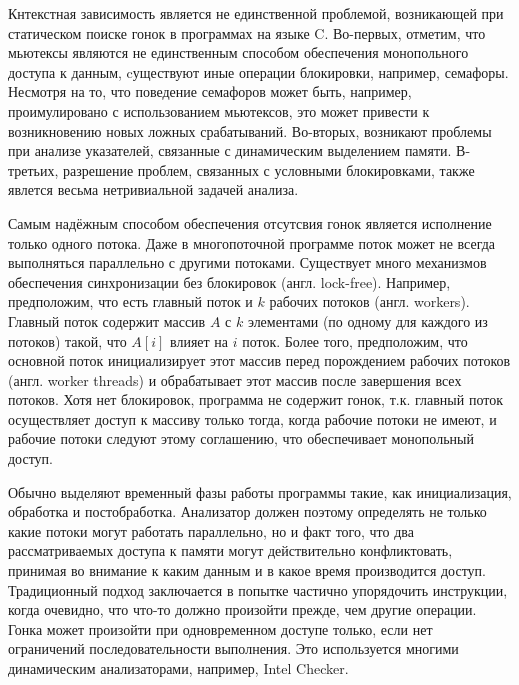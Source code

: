\Conclusion

Кнтекстная зависимость является не единственной проблемой, возникающей при статическом поиске гонок в программах на языке C. Во-первых, отметим, что мьютексы являются не единственным способом обеспечения монопольного доступа к данным, cуществуют иные операции блокировки, например, семафоры. Несмотря на то, что поведение семафоров может быть, например, проимулировано с использованием мьютексов, это может привести к возникновению новых ложных срабатываний. Во-вторых, возникают проблемы при анализе указателей, связанные с динамическим выделением памяти. В-третьих, разрешение проблем, связанных с условными блокировками, также явлется весьма нетривиальной задачей анализа.

Самым надёжным способом обеспечения отсутсвия гонок является исполнение только одного потока. Даже в многопоточной программе поток может не всегда выполняться параллельно с другими потоками. Существует много механизмов обеспечения синхронизации без блокировок (англ. lock-free). Например, предположим, что есть главный поток и $k$ рабочих потоков (англ. workers). Главный поток содержит массив $A$ с $k$ элементами (по одному для каждого из потоков) такой, что $A[i]$ влияет на $i$ поток. Более того, предположим, что основной поток инициализирует этот массив перед порождением рабочих потоков (англ. worker threads) и обрабатывает этот массив после завершения всех потоков. Хотя нет блокировок, программа не содержит гонок, т.к. главный поток осуществляет доступ к массиву только тогда, когда рабочие потоки не имеют, и рабочие потоки следуют этому соглашению, что обеспечивает монопольный доступ.

Обычно выделяют временный фазы работы программы такие, как инициализация, обработка и постобработка. Анализатор должен поэтому определять не только какие потоки могут работать параллельно, но и факт того, что два рассматриваемых доступа к памяти могут действительно конфликтовать, принимая во внимание к каким данным и в какое время производится доступ. Традиционный подход заключается в попытке частично упорядочить инструкции, когда очевидно, что что-то должно произойти прежде, чем другие операции. Гонка может произойти при одновременном доступе только, если нет ограничений последовательности выполнения. Это используется многими динамическим анализаторами, например, Intel Checker.
